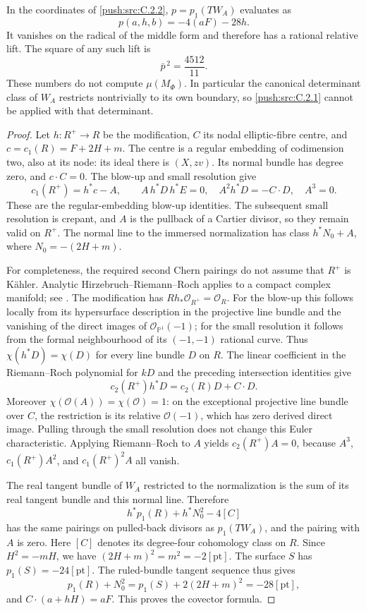 \begin{proposition}\label{push:src:C.2.3}
In the coordinates of \ref{push:src:C.2.2}, $p=p_1(TW_A)$ evaluates as
\[
 p(a,h,b)=-4(aF)-28h.
\]
It vanishes on the radical of the middle form and therefore has a
rational relative lift. The square of any such lift is
\[
 \bar p^{\,2}=\frac{4512}{11}.
\]
These numbers do not compute $\mu(M_\Phi)$. In particular the
canonical determinant class of $W_A$ restricts nontrivially to its
own boundary, so \ref{push:src:C.2.1} cannot be applied with that determinant.
\end{proposition}
\begin{proof}
Let $h:R^+\to R$ be the modification, $C$ its nodal elliptic-fibre
centre, and $c=c_1(R)=F+2H+m$. The centre is a regular embedding of
codimension two, also at its node: its ideal there is $(X,zv)$.
Its normal bundle has degree zero, and $c\cdot C=0$. The blow-up
and small resolution give
\[
 c_1(R^+)=h^*c-A,\qquad
 A\,h^*D\,h^*E=0,\quad
 A^2h^*D=-C\cdot D,\quad A^3=0.
\]
These are the regular-embedding blow-up identities. The subsequent
small resolution is crepant, and $A$ is the pullback of a Cartier
divisor, so they remain valid on $R^+$. The normal line to the
immersed normalization has class
$h^*N_0+A$, where $N_0=-(2H+m)$.

For completeness, the required second Chern pairings do not assume
that $R^+$ is K\"ahler. Analytic Hirzebruch--Riemann--Roch applies to
a compact complex manifold; see \citet[Theorem~4.3, pp.~564--565]{AtiyahSinger1968IIIE}.
The modification has $Rh_*\mathcal O_{R^+}=\mathcal O_R$.
For the blow-up this follows locally from its hypersurface description
in the projective line bundle and the vanishing of the direct images
of $\mathcal O_{\mathbb P^1}(-1)$; for the small resolution it follows
from the formal neighbourhood of its $(-1,-1)$ rational curve.
Thus $\chi(h^*D)=\chi(D)$ for every line bundle $D$ on $R$.
The linear coefficient in the Riemann--Roch polynomial for $kD$
and the preceding intersection identities give
\[
 c_2(R^+)h^*D=c_2(R)D+C\cdot D.
\]
Moreover $\chi(\mathcal O(A))=\chi(\mathcal O)=1$: on the
exceptional projective line bundle over $C$, the restriction is its
relative $\mathcal O(-1)$, which has zero derived direct image.
Pulling through the small resolution does not change this Euler
characteristic. Applying Riemann--Roch to $A$ yields $c_2(R^+)A=0$,
because $A^3$, $c_1(R^+)A^2$, and $c_1(R^+)^2A$ all vanish.

The real tangent bundle of $W_A$ restricted to the normalization is
the sum of its real tangent bundle and this normal line. Therefore
\[
 h^*p_1(R)+h^*N_0^2-4[C]
\]
has the same pairings on pulled-back divisors as $p_1(TW_A)$, and
the pairing with $A$ is zero. Here $[C]$ denotes its degree-four
cohomology class on $R$. Since $H^2=-mH$, we have
$(2H+m)^2=m^2=-2[\mathrm{pt}]$. The surface $S$ has
$p_1(S)=-24[\mathrm{pt}]$. The ruled-bundle tangent sequence thus
gives
\[
 p_1(R)+N_0^2=p_1(S)+2(2H+m)^2=-28[\mathrm{pt}],
\]
and $C\cdot(a+hH)=aF$. This proves the covector formula.


\end{proof}
